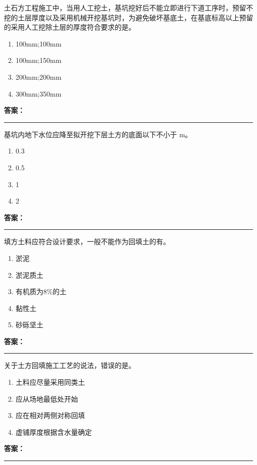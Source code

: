 \documentclass[UTF8,fontset=fandol,11pt]{ctexart}
\newcommand{\answerline}{\textcolor{answerred}{\rule{2.4cm}{0.7pt}}}
\begin{document}
\begin{quizbox}[title={第 15 题}]
土石方工程施工中，当用人工挖土，基坑挖好后不能立即进行下道工序时，预留不挖的土层厚度以及采用机械开挖基坑时，为避免破坏基底土，在基底标高以上预留的采用人工挖除土层的厚度符合要求的是。\\
\begin{enumerate}[label=\Alph*.]
\item 100mm;100mm
\item 100mm;150mm
\item 200mm;200mm
\item 300mm;350mm
\end{enumerate}
\textbf{\textcolor{answerred}{答案：}} \answerline
\end{quizbox}

\vspace{0.2em}

\begin{quizbox}[title={第 16 题}]
基坑内地下水位应降至拟开挖下层土方的底面以下不小于 m。\\
\begin{enumerate}[label=\Alph*.]
\item 0.3
\item 0.5
\item 1
\item 2
\end{enumerate}
\textbf{\textcolor{answerred}{答案：}} \answerline
\end{quizbox}

\vspace{0.2em}

\begin{quizbox}[title={第 17 题}]
填方土料应符合设计要求，一般不能作为回填土的有。\\
\begin{enumerate}[label=\Alph*.]
\item 淤泥
\item 淤泥质土
\item 有机质为8\%的土
\item 黏性土
\item 砂砾坚土
\end{enumerate}
\textbf{\textcolor{answerred}{答案：}} \answerline
\end{quizbox}

\vspace{0.2em}

\begin{quizbox}[title={第 18 题}]
关于土方回填施工工艺的说法，错误的是。\\
\begin{enumerate}[label=\Alph*.]
\item 土料应尽量采用同类土
\item 应从场地最低处开始
\item 应在相对两侧对称回填
\item 虚铺厚度根据含水量确定
\end{enumerate}
\textbf{\textcolor{answerred}{答案：}} \answerline
\end{quizbox}
\end{document}
